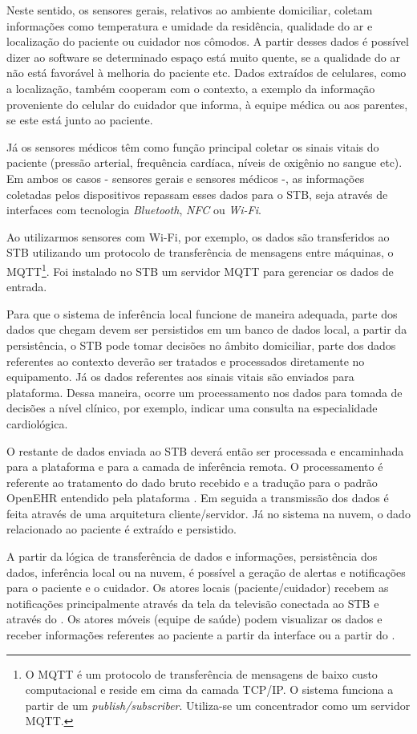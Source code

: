 
Neste sentido, os sensores gerais, relativos ao ambiente domiciliar, coletam
informações como  temperatura e umidade da residência, qualidade do ar e
localização do paciente ou cuidador nos cômodos. A partir desses dados é
possível dizer ao software se determinado espaço está muito quente, se a
qualidade do ar não está favorável à melhoria do paciente etc. Dados extraídos
de celulares, como a localização, também cooperam com o contexto, a exemplo da
informação proveniente do celular do cuidador que informa, à equipe médica ou
aos parentes, se este está junto ao paciente.

Já os sensores médicos têm como função principal coletar os sinais vitais do
paciente (pressão arterial, frequência cardíaca, níveis de oxigênio no sangue
etc). Em ambos os casos - sensores gerais e sensores médicos -, as informações
coletadas pelos dispositivos repassam  esses dados para o STB, seja através de
interfaces com tecnologia  \textit{Bluetooth}, \textit{NFC} ou \textit{Wi-Fi}.

Ao utilizarmos sensores com Wi-Fi, por exemplo, os dados são transferidos ao
STB utilizando um protocolo de transferência de mensagens entre máquinas, o
MQTT\footnote{O MQTT é um protocolo de transferência de mensagens de baixo
custo computacional e reside em cima da camada TCP/IP. O sistema funciona a
partir de um \textit{publish/subscriber}. Utiliza-se um concentrador como um
servidor MQTT.}.  Foi instalado no STB um servidor MQTT para gerenciar os dados
de entrada.

Para que o sistema de inferência local funcione de maneira adequada, parte dos
dados que chegam devem ser persistidos em um banco de dados local, a partir da
persistência, o STB pode tomar decisões no âmbito domiciliar, parte dos dados
referentes ao contexto deverão ser tratados e processados diretamente no
equipamento.  Já os dados referentes aos sinais vitais são enviados para
plataforma. Dessa maneira, ocorre um processamento nos dados para tomada de
decisões a nível clínico, por exemplo, indicar uma consulta na especialidade
cardiológica.

O restante de dados enviada ao STB deverá então ser processada e encaminhada
para a plataforma \nextsaude[] e para a camada de inferência remota.  O
processamento é referente ao tratamento do dado bruto recebido e a tradução
para o padrão OpenEHR entendido pela plataforma \nextsaude[]. Em seguida a
transmissão dos dados é feita através de uma arquitetura  cliente/servidor. Já
no sistema na nuvem, o dado relacionado ao paciente é extraído e persistido.

A partir da lógica de transferência de dados e informações, persistência
dos dados, inferência local ou na nuvem, é possível a geração de alertas e
notificações para o paciente e o cuidador. Os atores locais (paciente/cuidador) 
recebem as notificações principalmente através da tela da televisão conectada ao 
STB e através do \smartphone. Os atores móveis (equipe de saúde) podem visualizar 
os dados e receber informações referentes ao paciente a partir da interface \web[] ou 
a partir do \smartphone.



